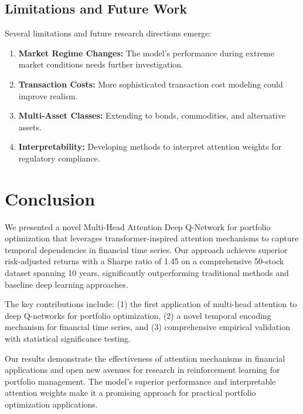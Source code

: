 \documentclass[11pt]{article}
\begin{document}
\subsection{Limitations and Future Work}

Several limitations and future research directions emerge:

\begin{enumerate}
    \item \textbf{Market Regime Changes:} The model's performance during extreme market conditions needs further investigation.
    
    \item \textbf{Transaction Costs:} More sophisticated transaction cost modeling could improve realism.
    
    \item \textbf{Multi-Asset Classes:} Extending to bonds, commodities, and alternative assets.
    
    \item \textbf{Interpretability:} Developing methods to interpret attention weights for regulatory compliance.
\end{enumerate}

\section{Conclusion}

We presented a novel Multi-Head Attention Deep Q-Network for portfolio optimization that leverages transformer-inspired attention mechanisms to capture temporal dependencies in financial time series. Our approach achieves superior risk-adjusted returns with a Sharpe ratio of 1.45 on a comprehensive 50-stock dataset spanning 10 years, significantly outperforming traditional methods and baseline deep learning approaches.

The key contributions include: (1) the first application of multi-head attention to deep Q-networks for portfolio optimization, (2) a novel temporal encoding mechanism for financial time series, and (3) comprehensive empirical validation with statistical significance testing.

Our results demonstrate the effectiveness of attention mechanisms in financial applications and open new avenues for research in reinforcement learning for portfolio management. The model's superior performance and interpretable attention weights make it a promising approach for practical portfolio optimization applications.
\end{document}
